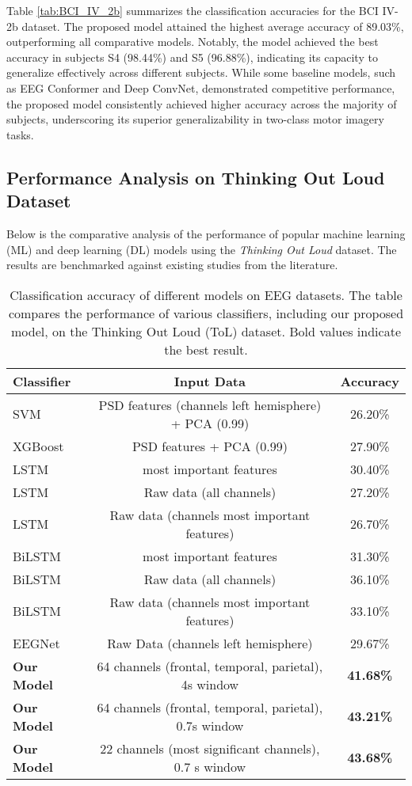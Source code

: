 \documentclass[pdflatex,sn-mathphys-num]{sn-jnl}%
\theoremstyle{thmstyleone}%
\theoremstyle{thmstyletwo}%
\theoremstyle{thmstylethree}%
\begin{document}
Table \ref{tab:BCI_IV_2b} summarizes the classification accuracies for the BCI IV-2b dataset. The proposed model attained the highest average accuracy of 89.03\%, outperforming all comparative models. Notably, the model achieved the best accuracy in subjects S4 (98.44\%) and S5 (96.88\%), indicating its capacity to generalize effectively across different subjects. While some baseline models, such as EEG Conformer and Deep ConvNet, demonstrated competitive performance, the proposed model consistently achieved higher accuracy across the majority of subjects, underscoring its superior generalizability in two-class motor imagery tasks.

\subsection{Performance Analysis on Thinking Out Loud Dataset}
Below is the comparative analysis of the performance of popular machine learning (ML) and deep learning (DL) models using the \textit{Thinking Out Loud} dataset. The results are benchmarked against existing studies from the literature.

\begin{table}[h]
\centering
\caption{Classification accuracy of different models on EEG datasets. The table compares the performance of various classifiers, including our proposed model, on the Thinking Out Loud (ToL) dataset. Bold values indicate the best result.}
\label{tab:performance_comparison_tol}
\begin{tabular}{lcc}
\toprule
\textbf{Classifier} & \textbf{Input Data} & \textbf{Accuracy} \\
\midrule
SVM & PSD features (channels left hemisphere) + PCA (0.99) & 26.20\% \\
\addlinespace
XGBoost & PSD features + PCA (0.99) & 27.90\% \\
\addlinespace
LSTM & most important features & 30.40\% \\
\addlinespace
LSTM & Raw data (all channels) & 27.20\% \\
\addlinespace
LSTM & Raw data (channels most important features) & 26.70\% \\
\addlinespace
BiLSTM & most important features & 31.30\% \\
\addlinespace
BiLSTM & Raw data (all channels) & 36.10\% \\
\addlinespace
BiLSTM & Raw data (channels most important features) & 33.10\% \\
\addlinespace
EEGNet & Raw Data (channels left hemisphere) & 29.67\% \\
\addlinespace
\textbf{Our Model} & 64 channels (frontal, temporal, parietal), 4s window & \textbf{41.68\%} \\
\addlinespace
\textbf{Our Model} & 64 channels (frontal, temporal, parietal), 0.7s window & \textbf{43.21\%} \\
\addlinespace
\textbf{Our Model} & 22 channels (most significant channels), 0.7 s window & \textbf{43.68\%} \\
\bottomrule
\end{tabular}
\end{table}
\end{document}
